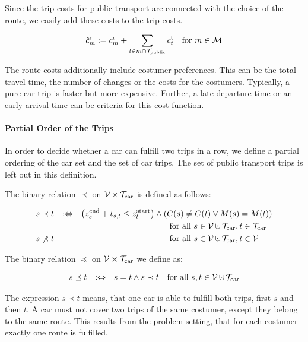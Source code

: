 Since the trip costs for public transport are connected with the choice of the route, we easily add these costs to the trip costs.

\begin{align*}
	\hat{c}^{\operatorname{r}}_m := c^{\operatorname{r}}_m + \sum_{t\in m\cap\mathcal{T}_{\operatorname{public}}}c^{\operatorname{t}}_t && \text{for } m\in\mathcal{M}
\end{align*}

The route costs additionally include costumer preferences. This can be the total travel time, the number of changes or the costs for the costumers. Typically, a pure car trip is faster but more expensive. Further, a late departure time or an early arrival time can be criteria for this cost function.

\paragraph{Partial Order of the Trips} \parfill

In order to decide whether a car can fulfill two trips in a row, we define a partial ordering of the car set and the set of car trips. The set of public transport trips is left out in this definition.

\begin{definition}
\label{def:partial_order}

The binary relation $\prec$ on $\mathcal{V}\times\mathcal{T}_{\operatorname{car}}$ is defined as follows:

\begin{align*}
	s\prec t && :\Leftrightarrow && \left(\zend_s + t_{s,t} \leq \zstart_t\right)\land\left(	C(s)\neq C(t)\lor M(s)=M(t)\right) \\
	&&&& \text{for all } s\in\mathcal{V}\cupdot\Tcar, t\in\Tcar \hphantom{\mathcal{V}} \\
	s\not\prec t &&&& \text{for all } s\in\mathcal{V}\cupdot\Tcar, t\in\mathcal{V} \hphantom{\Tcar}
\end{align*}

The binary relation $\preceq$ on $\mathcal{V}\times\mathcal{T}_{\operatorname{car}}$ we define as:

\begin{align*}
	s\preceq t && :\Leftrightarrow && s=t \land s\prec t && \text{for all } s,t\in\mathcal{V}\cupdot\Tcar
\end{align*}

\end{definition}

The expression $s\prec t$ means, that one car is able to fulfill both trips, first $s$ and then $t$. A car must not cover two trips of the same costumer, except they belong to the same route. This results from the problem setting, that for each costumer exactly one route is fulfilled. 

